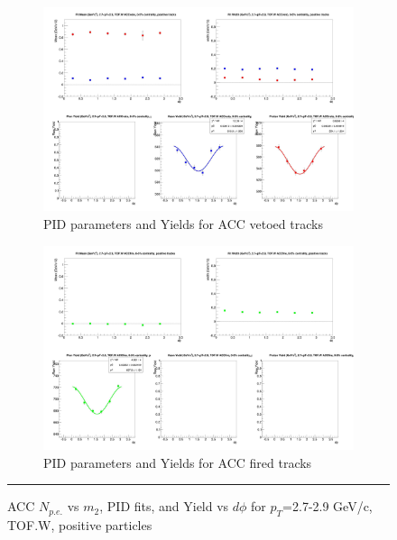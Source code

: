 \begin{figure}[H]
  \ContinuedFloat
    \begin{subfigure}{1\textwidth}
    \includegraphics[width=1\textwidth]{hiptfits/pos/fitParams_tof2_cent0_ch1_pT-27-29.jpg}
    \caption{PID parameters and Yields for ACC vetoed tracks}
    \end{subfigure}    
    \begin{subfigure}{1\textwidth}
    \includegraphics[width=1\textwidth]{hiptfits/pos/fitParams_tof3_cent0_ch1_pT-27-29.jpg}
    \caption{PID parameters and Yields for ACC fired tracks}
    \end{subfigure} 
    \rule{35em}{0.5pt}
  \caption[ACC $N_{p.e.}$ vs $m_2$, PID fits, and Yield vs $d\phi$ for $p_T$=2.7-2.9 GeV/c, TOF.W, positive particles]{ACC $N_{p.e.}$ vs $m_2$, PID fits, and Yield vs $d\phi$ for $p_T$=2.7-2.9 GeV/c, TOF.W, positive particles}
  \label{fig:acc27-29pos}
\end{figure}


